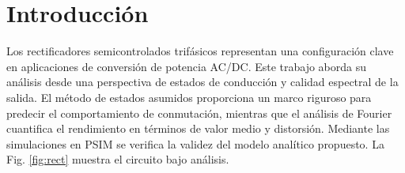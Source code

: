 \documentclass[conference]{IEEEtran}
\begin{document}
\IEEEpeerreviewmaketitle



\section{Introducción}
Los rectificadores semicontrolados trifásicos representan una configuración clave en aplicaciones de conversión de potencia AC/DC.
Este trabajo aborda su análisis desde una perspectiva de estados de conducción y calidad espectral de la salida. El método de estados asumidos proporciona un marco riguroso para predecir el
comportamiento de conmutación, mientras que el análisis de Fourier cuantifica el rendimiento en términos de valor medio y distorsión. Mediante las simulaciones en PSIM se verifica la validez
del modelo analítico propuesto. La Fig. \ref{fig:rect} muestra el circuito bajo análisis.
\end{document}
